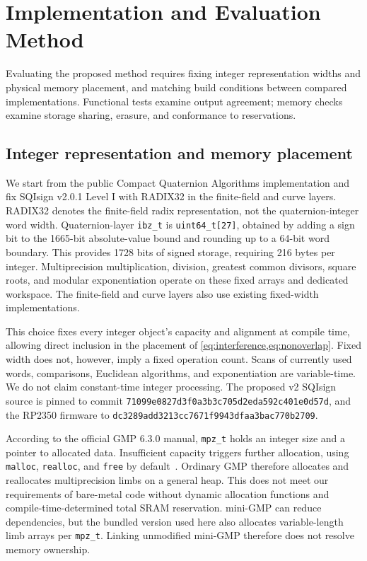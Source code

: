 \documentclass[a4paper,10pt]{article}
\theoremstyle{definition}
\theoremstyle{remark}
\begin{document}
\section{Implementation and Evaluation Method}
\label{sec:implementation}
\label{sec:evaluation-method}

Evaluating the proposed method requires fixing integer representation widths and physical memory placement, and matching build conditions between compared implementations. Functional tests examine output agreement; memory checks examine storage sharing, erasure, and conformance to reservations.

\subsection{Integer representation and memory placement}

We start from the public Compact Quaternion Algorithms implementation and fix SQIsign v2.0.1 Level I with RADIX32 in the finite-field and curve layers. RADIX32 denotes the finite-field radix representation, not the quaternion-integer word width. Quaternion-layer \texttt{ibz\_t} is \texttt{uint64\_t[27]}, obtained by adding a sign bit to the 1665-bit absolute-value bound and rounding up to a 64-bit word boundary. This provides 1728 bits of signed storage, requiring 216 bytes per integer. Multiprecision multiplication, division, greatest common divisors, square roots, and modular exponentiation operate on these fixed arrays and dedicated workspace. The finite-field and curve layers also use existing fixed-width implementations.

This choice fixes every integer object's capacity and alignment at compile time, allowing direct inclusion in the placement of \cref{eq:interference,eq:nonoverlap}. Fixed width does not, however, imply a fixed operation count. Scans of currently used words, comparisons, Euclidean algorithms, and exponentiation are variable-time. We do not claim constant-time integer processing. The proposed v2 SQIsign source is pinned to commit \texttt{71099e0827d3f0a3b3c705d2eda592c401e0d57d}, and the RP2350 firmware to \texttt{dc3289add3213cc7671f9943dfaa3bac770b2709}.

According to the official GMP 6.3.0 manual, \texttt{mpz\_t} holds an integer size and a pointer to allocated data. Insufficient capacity triggers further allocation, using \texttt{malloc}, \texttt{realloc}, and \texttt{free} by default~\cite{gmp-manual-630}. Ordinary GMP therefore allocates and reallocates multiprecision limbs on a general heap. This does not meet our requirements of bare-metal code without dynamic allocation functions and compile-time-determined total SRAM reservation. mini-GMP can reduce dependencies, but the bundled version used here also allocates variable-length limb arrays per \texttt{mpz\_t}. Linking unmodified mini-GMP therefore does not resolve memory ownership.
\end{document}
